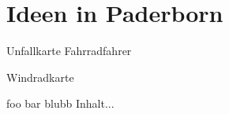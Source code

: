 \section{Ideen in Paderborn}

\begin{frame}[t]{Unfallkarte Fahrradfahrer}
\end{frame}

\begin{frame}[t]{Windradkarte}
\end{frame}

\begin{frame}[t]{foo bar blubb}
Inhalt...
\end{frame}
